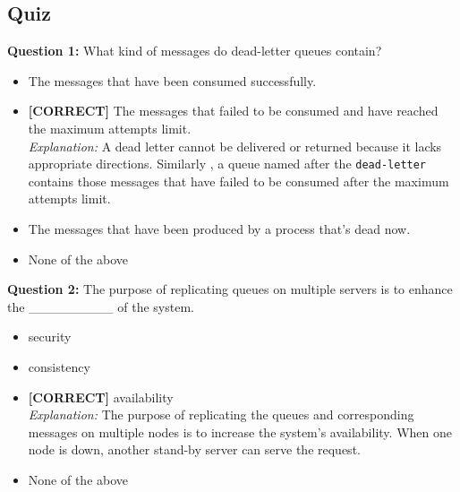 

\subsection*{Quiz}
\vspace{0.3cm}
\noindent
\textbf{Question 1:} What kind of messages do dead-letter queues contain?
\\[0.2cm]
\begin{itemize}
 \item The messages that have been consumed successfully.
 \item \textbf{[CORRECT]} The messages that failed to be consumed and have reached the maximum attempts limit.
\\[0.1cm]
\textit{Explanation:} 
A dead letter cannot be delivered or returned because it lacks appropriate directions. Similarly , a queue named after the \texttt{dead-letter} contains those messages that have failed to be consumed after the maximum attempts limit.
 \item The messages that have been produced by a process that's dead now.
 \item None of the above
\end{itemize}
\vspace{0.3cm}
\noindent
\textbf{Question 2:} The purpose of replicating queues on multiple servers is to enhance the \_\_\_\_\_\_\_\_\_ of the system.
\\[0.2cm]
\begin{itemize}
 \item security
 \item consistency
 \item \textbf{[CORRECT]} availability
\\[0.1cm]
\textit{Explanation:} 
The purpose of replicating the queues and corresponding messages on multiple nodes is to increase the system's availability. When one node is down, another stand-by server can serve the request.
 \item None of the above
\end{itemize}
\vspace{0.3cm}
\noindent
